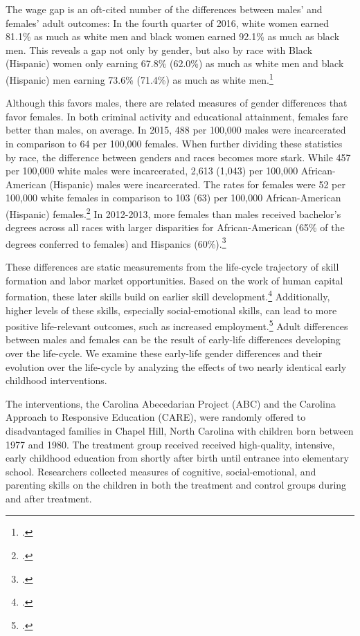 The wage gap is an oft-cited number of the differences between males' and females' adult outcomes: In the fourth quarter of 2016, white women earned 81.1\% as much as white men and black women earned 92.1\% as much as black men. This reveals a gap not only by gender, but also by race with Black (Hispanic) women only earning 67.8\% (62.0\%) as much as white men and black (Hispanic) men earning 73.6\% (71.4\%) as much as white men.\footnote{\citet{USDPTL_2017_Wage_News-Release}.}

 Although this favors males, there are related measures of gender differences that favor females. In both criminal activity and educational attainment, females fare better than males, on average. In 2015, 488 per 100,000 males were incarcerated in comparison to 64 per 100,000 females. When further dividing these statistics by race, the difference between genders and races becomes more stark. While 457 per 100,000 white males were incarcerated, 2,613 (1,043) per 100,000 African-American (Hispanic) males were incarcerated. The rates for females were 52 per 100,000 white females in comparison to 103 (63) per 100,000 African-American (Hispanic) females.\footnote{\citet{UDOJ_2016_PrisonersStatistics_Bulletin}.} In 2012-2013, more females than males received bachelor's degrees across all races with larger disparities for African-American (65\% of the degrees conferred to females) and Hispanics (60\%).\footnote{\citet{UDOE_2016_Statistics_Report}.}

These differences are static measurements from the life-cycle trajectory of skill formation and labor market opportunities. Based on the work of human capital formation, these later skills build on earlier skill development.\footnote{\citet{}.} Additionally, higher levels of these skills, especially social-emotional skills, can lead to more positive life-relevant outcomes, such as increased employment.\footnote{\citet{}.} Adult differences between males and females can be the result of early-life differences developing over the life-cycle. We examine these early-life gender differences and their evolution over the life-cycle by analyzing the effects of two nearly identical early childhood interventions. 

The interventions, the Carolina Abecedarian Project (ABC) and the Carolina Approach to Responsive Education (CARE), were randomly offered to disadvantaged families in Chapel Hill, North Carolina with children born between 1977 and 1980. The treatment group received received high-quality, intensive, early childhood education from shortly after birth until entrance into elementary school. Researchers collected measures of cognitive, social-emotional, and parenting skills on the children in both the treatment and control groups during and after treatment. 

